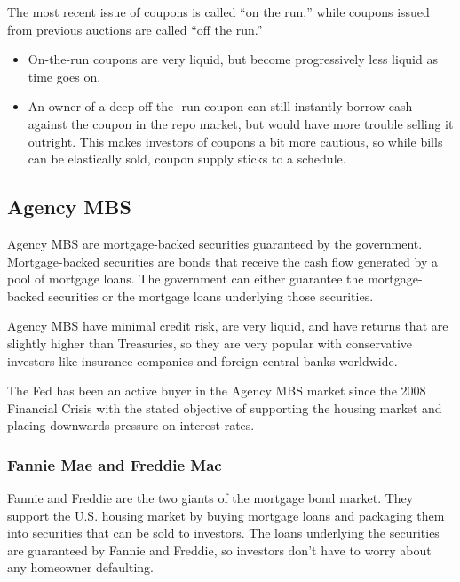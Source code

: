 \documentclass[
]{book}
\providecommand{\tightlist}{%
  \setlength{\itemsep}{0pt}\setlength{\parskip}{0pt}}
\begin{document}
The most recent issue of coupons is called ``on the run,'' while coupons issued from previous auctions are called ``off the run.''

\begin{itemize}
\tightlist
\item
  On-the-run coupons are very liquid, but become progressively less liquid as time goes on.
\item
  An owner of a deep off-the- run coupon can still instantly borrow cash against the coupon in the repo market, but would have more trouble selling it outright. This makes investors of coupons a bit more cautious, so while bills can be elastically sold, coupon supply sticks to a schedule.
\end{itemize}

\hypertarget{agency-mbs}{%
\subsection{Agency MBS}\label{agency-mbs}}

Agency MBS are mortgage-backed securities guaranteed by the government. Mortgage-backed securities are bonds that receive the cash flow generated by a pool of mortgage loans. The government can either guarantee the mortgage-backed securities or the mortgage loans underlying those securities.

Agency MBS have minimal credit risk, are very liquid, and have returns that are slightly higher than Treasuries, so they are very popular with conservative investors like insurance companies and foreign central banks worldwide.

The Fed has been an active buyer in the Agency MBS market since the 2008 Financial Crisis with the stated objective of supporting the housing market and placing downwards pressure on interest rates.

\hypertarget{fannie-mae-and-freddie-mac}{%
\subsubsection{Fannie Mae and Freddie Mac}\label{fannie-mae-and-freddie-mac}}

Fannie and Freddie are the two giants of the mortgage bond market. They support the U.S. housing market by buying mortgage loans and packaging them into securities that can be sold to investors. The loans underlying the securities are guaranteed by Fannie and Freddie, so investors don't have to worry about any homeowner defaulting.
\end{document}
